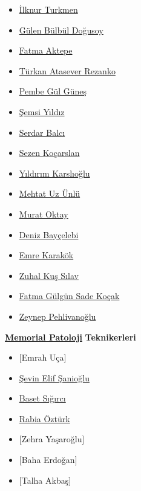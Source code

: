 \documentclass[
  letterpaper,
  DIV=11,
  numbers=noendperiod]{scrreprt}
\begin{document}
\begin{itemize}
\item
  \href{https://www.memorial.com.tr/en/doctors/ilknur-turkmen-1975}{İlknur
  Turkmen}
\item
  \href{https://www.memorial.com.tr/doktorlar/gulen-bulbul-dogusoy}{Gülen
  Bülbül Doğusoy}
\item
  \href{https://www.memorial.com.tr/doktorlar/fatma-aktepe}{Fatma
  Aktepe}
\item
  \href{https://www.memorial.com.tr/doktorlar/turkan-atasever-rezanko}{Türkan
  Atasever Rezanko}
\item
  \href{https://www.memorial.com.tr/doktorlar/pembe-gul-gunes}{Pembe Gül
  Güneş}
\item
  \href{https://www.memorial.com.tr/doktorlar/semsi-yildiz}{Şemsi
  Yıldız}
\item
  \href{https://www.memorial.com.tr/doktorlar/serdar-balci-k}{Serdar
  Balcı}
\item
  \href{https://www.memorial.com.tr/doktorlar/sezen-kocarslan}{Sezen
  Koçarslan}
\item
  \href{https://www.memorial.com.tr/doktorlar/yildirim-karslioglu}{Yıldırım
  Karslıoğlu}
\item
  \href{https://www.memorial.com.tr/doktorlar/mehtat-uz-unlu}{Mehtat Uz
  Ünlü}
\item
  \href{https://www.memorial.com.tr/doktorlar/murat-oktay}{Murat Oktay}
\item
  \href{https://www.memorial.com.tr/doktorlar/deniz-baycelebi}{Deniz
  Bayçelebi}
\item
  \href{https://www.memorial.com.tr/doktorlar/emre-karakok}{Emre
  Karakök}
\item
  \href{https://www.memorial.com.tr/doktorlar/zuhal-kus-silav}{Zuhal Kuş
  Sılav}
\item
  \href{https://www.memorial.com.tr/doktorlar/fatma-gulgun-sade-kocak}{Fatma
  Gülgün Sade Koçak}
\item
  \href{https://www.memorial.com.tr/doktorlar/zeynep-pehlivanoglu}{Zeynep
  Pehlivanoğlu}
\end{itemize}

\href{https://patoloji.memorial.com.tr/}{\textbf{Memorial Patoloji}}
\textbf{Teknikerleri}

\begin{itemize}
\item
  {[}Emrah Uça{]}
\item
  \href{https://www.linkedin.com/in/\%C5\%9Fevin-elif-\%C5\%9Fanio\%C4\%9Flu-99449a1b0/}{Şevin
  Elif Şanioğlu}
\item
  \href{https://www.linkedin.com/in/baset-s\%C4\%B1\%C4\%9F\%C4\%B1rc\%C4\%B1-aa2406141/}{Baset
  Sığırcı}
\item
  \href{https://www.linkedin.com/in/rabia-\%C3\%B6zt\%C3\%BCrk-4989b3151/}{Rabia
  Öztürk}
\item
  {[}Zehra Yaşaroğlu{]}
\item
  {[}Baha Erdoğan{]}
\item
  {[}Talha Akbaş{]}
\end{itemize}
\end{document}
